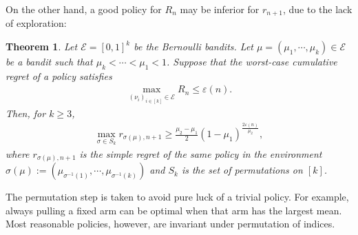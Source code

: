 \documentclass[letterpaper,11pt,openright,openany]{book}
\numberwithin{equation}{section}
\theoremstyle{plain}
\newtheorem{Th}{Theorem}[section]
\theoremstyle{definition}
\def\e{{\varepsilon}}
\begin{document}
On the other hand, a good policy for $R_n$ may be inferior for $r_{n+1}$, due to the lack of exploration:

\begin{Th}\label{bb:LB}
Let $\mathcal E=[0,1]^k$ be the Bernoulli bandits. Let $\mu = (\mu_1, \cdots, \mu_k)\in\mathcal E$ be a bandit such that $\mu_k<\cdots<\mu_1<1$. Suppose that the worst-case cumulative regret of a policy satisfies 
\begin{align}
\max_{(\nu_i)_{i\in [k]}\in\mathcal E}R_n\leq\e(n). \label{bb:1}
\end{align}
Then, for $k\geq 3$,
\begin{align*}
\max_{\sigma\in S_k}r_{\sigma(\mu), n+1}\geq\frac{\mu_2-\mu_1}{2}(1-\mu_1)^{\frac{2\e(n)}{\mu_2}},
\end{align*}
where $r_{\sigma(\mu), n+1}$ is the simple regret of the same policy in the environment $\sigma(\mu):=(\mu_{\sigma^{-1}(1)}, \cdots, \mu_{\sigma^{-1}(k)})$ and $S_k$ is the set of permutations on $[k]$.  
\end{Th}
The permutation step is taken to avoid pure luck of a trivial policy. For example, always pulling a fixed arm can be optimal when that arm has the largest mean. Most reasonable policies, however, are invariant under permutation of indices. 
\end{document}
